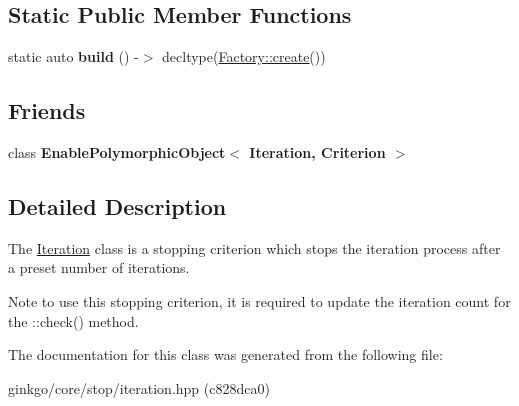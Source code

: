 \subsection*{Static Public Member Functions}
\begin{DoxyCompactItemize}
\item 
\mbox{\label{classgko_1_1stop_1_1Iteration_ae1644e1beb79d560ec9f1e63d147e258}} 
static auto {\bfseries build} () -\/$>$ decltype(\hyperlink{classgko_1_1EnableDefaultFactory_a1d077101d9e788e6c65f088612d14cc3}{Factory\+::create}())
\end{DoxyCompactItemize}
\subsection*{Friends}
\begin{DoxyCompactItemize}
\item 
\mbox{\label{classgko_1_1stop_1_1Iteration_a53441469892d9e127b487d868cd90aee}} 
class {\bfseries Enable\+Polymorphic\+Object$<$ Iteration, Criterion $>$}
\end{DoxyCompactItemize}


\subsection{Detailed Description}
The \hyperlink{classgko_1_1stop_1_1Iteration}{Iteration} class is a stopping criterion which stops the iteration process after a preset number of iterations. 

\begin{DoxyNote}{Note}
to use this stopping criterion, it is required to update the iteration count for the \+::check() method. 
\end{DoxyNote}


The documentation for this class was generated from the following file\+:\begin{DoxyCompactItemize}
\item 
ginkgo/core/stop/iteration.\+hpp (c828dca0)\end{DoxyCompactItemize}
